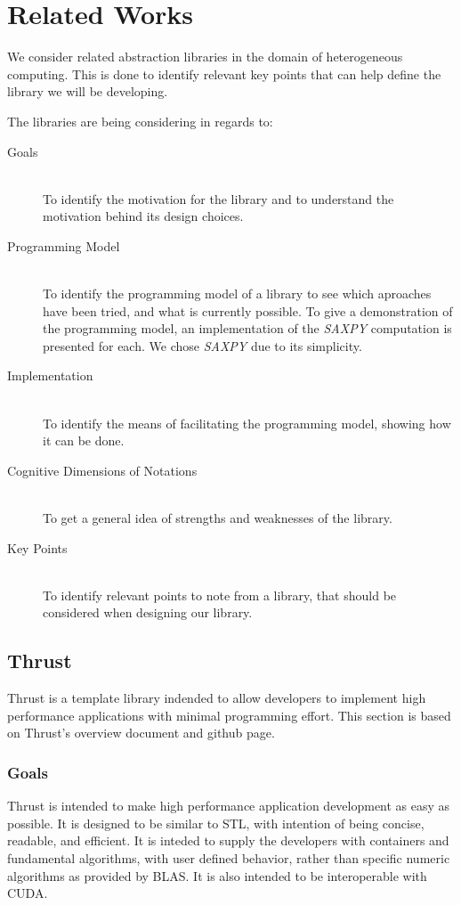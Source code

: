 \section{Related Works}
We consider related abstraction libraries in the domain of heterogeneous computing. This is done to identify relevant key points that can help define the library we will be developing.

The libraries are being considering in regards to:
\begin{description}
\item[Goals] \hfill \\
To identify the motivation for the library and to understand the motivation behind its design choices.
\item[Programming Model] \hfill \\
To identify the programming model of a library to see which aproaches have been tried, and what is currently possible. To give a demonstration of the programming model, an implementation of the \textit{SAXPY} computation is presented for each. We chose \textit{SAXPY} due to its simplicity.
\item[Implementation] \hfill \\
To identify the means of facilitating the programming model, showing how it can be done.
\item[Cognitive Dimensions of Notations] \hfill \\
To get a general idea of strengths and weaknesses of the library.
\item[Key Points] \hfill \\
To identify relevant points to note from a library, that should be considered when designing our library.
\end{description}




\subsection{Thrust}
Thrust is a template library indended to allow developers to implement high performance applications with minimal programming effort. This section is based on Thrust's overview document\cite{thrustOverview} and github page\cite{thrustGithub}.

\subsubsection{Goals}
Thrust is intended to make high performance application development as easy as possible. It is designed to be similar to STL, with intention of being concise, readable, and efficient. It is inteded to supply the developers with containers and fundamental algorithms, with user defined behavior, rather than specific numeric algorithms as provided by BLAS. It is also intended to be interoperable with CUDA.

